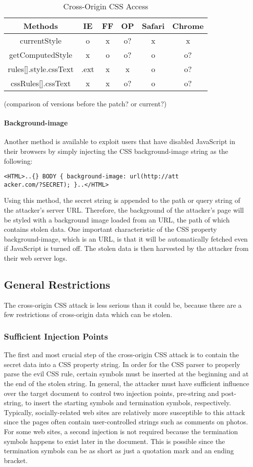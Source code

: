 \documentclass{acm_proc_article-sp}
\begin{document}
\begin{table}
\centering
\caption{Cross-Origin CSS Access}
\begin{tabular}{|c|c|c|c|c|c|} \hline
Methods&IE&FF&OP&Safari&Chrome\\ \hline
currentStyle&o&x&o?&x&x\\ \hline
getComputedStyle&x&o&o?&o&o?\\ \hline
rules[].style.cssText&.ext&x&x&o&o?\\ \hline
cssRules[].cssText&x&x&o?&o&o?\\
\hline\end{tabular}
(comparison of versions before the patch? or current?)
\end{table}

\paragraph{Background-image}
Another method is available to exploit users that have disabled JavaScript in their browsers by simply injecting the CSS background-image string as the following:
\begin{verbatim}
<HTML>..{} BODY { background-image: url(http://att
acker.com/?SECRET); }..</HTML>
\end{verbatim}
Using this method, the secret string is appended to the path or query string of the attacker's server URL. Therefore, the background of the attacker's page will be styled with a background image loaded from an URL, the path of which contains stolen data. One important characteristic of the CSS property background-image, which is an URL, is that it will be automatically fetched even if JavaScript is turned off. The stolen data is then harvested by the attacker from their web server logs.

\subsection{General Restrictions}
The cross-origin CSS attack is less serious than it could be, because there are a few restrictions of cross-origin data which can be stolen.

\subsubsection{Sufficient Injection Points}
The first and most crucial step of the cross-origin CSS attack is to contain the secret data into a CSS property string. In order for the CSS parser to properly parse the evil CSS rule, certain symbols must be inserted at the beginning and at the end of the stolen string. In general, the attacker must have sufficient influence over the target document to control two injection points, pre-string and post-string, to insert the starting symbols and termination symbols, respectively. Typically, socially-related web sites are relatively more susceptible to this attack since the pages often contain user-controlled strings such as comments on photos. For some web sites, a second injection is not required because the termination symbols happens to exist later in the document. This is possible since the termination symbols can be as short as just a quotation mark and an ending bracket. 
\end{document}
